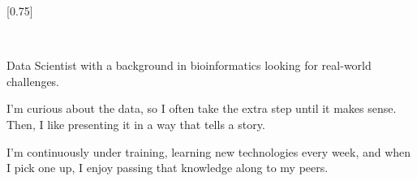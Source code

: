 \documentclass[darkhipster]{simplehipstercv}
\begin{document}
\setlength{\columnsep}{1.5cm}
[0.75]
\begin{paracol}{2}
\flushright
\paracolbackgroundoptions


\footnotesize
{\setasidefontcolour
\flushright
\begin{center}
\end{center}

\vspace{1em}



\vspace{1em}

\vspace{1em}

\setlength{\parindent}{0pt}
\vspace{1em}

\setlength{\parindent}{0pt}
\vspace{1em}

\\[0.5em]
\vspace{0.5em}

Data Scientist with a background in bioinformatics looking for real-world challenges. 

\vspace{1em}

I'm curious about the data, so I often take the extra step until it makes sense. Then, I like presenting it in a way that tells a story. 
\vspace{1em}

I'm continuously under training, learning new technologies every week, and when I pick one up, I enjoy passing that knowledge along to my peers. 



\bigskip


}
\end{paracol}
\end{document}
